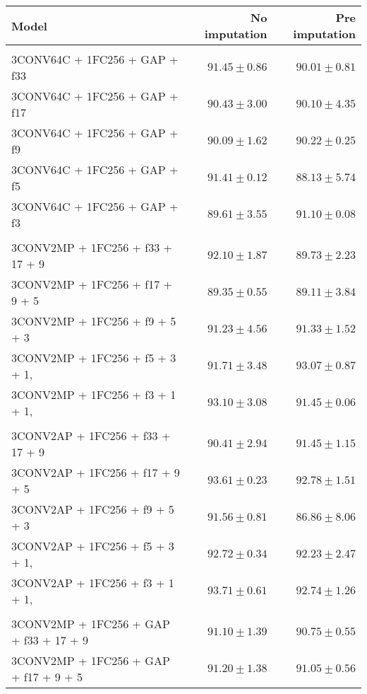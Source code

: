  \begin{table}[!htbp]
  \centering
   \begin{tabular}{lrr}
   Model                  & No imputation         & Pre imputation             \\[0.2cm]
   \hline \\[-0.2cm]
    
  
    3CONV64C + 1FC256 + GAP + f33  	 & $91.45 \pm 0.86$ 	 & $90.01 \pm 0.81$\\
    3CONV64C + 1FC256 + GAP + f17  	 & $90.43 \pm 3.00$ 	 & $90.10 \pm 4.35$\\
    3CONV64C + 1FC256 + GAP + f9  	 & $90.09 \pm 1.62$ 	 & $90.22 \pm 0.25$\\
    3CONV64C + 1FC256 + GAP + f5  	 & $91.41 \pm 0.12$ 	 & $88.13 \pm 5.74$\\
    3CONV64C + 1FC256 + GAP + f3  	 & $89.61 \pm 3.55$ 	 & $91.10 \pm 0.08$
    \\[0.2cm] \hline \\[-0.2cm]
    3CONV2MP + 1FC256 + f33 + 17 + 9  	 & $92.10 \pm 1.87$ 	 & $89.73 \pm 2.23$\\
    3CONV2MP + 1FC256 + f17 + 9 + 5  	 & $89.35 \pm 0.55$ 	 & $89.11 \pm 3.84$\\
    3CONV2MP + 1FC256 + f9 + 5 + 3  	 & $91.23 \pm 4.56$ 	 & $91.33 \pm 1.52$\\
    3CONV2MP + 1FC256 + f5 + 3 + 1,  	 & $91.71 \pm 3.48$ 	 & $93.07 \pm 0.87$\\
    3CONV2MP + 1FC256 + f3 + 1 + 1,  	 & $93.10 \pm 3.08$ 	 & $91.45 \pm 0.06$
    \\[0.2cm] \hline \\[-0.2cm]
    3CONV2AP + 1FC256 + f33 + 17 + 9  	 & $90.41 \pm 2.94$ 	 & $91.45 \pm 1.15$\\
    3CONV2AP + 1FC256 + f17 + 9 + 5  	 & $93.61 \pm 0.23$ 	 & $92.78 \pm 1.51$\\
    3CONV2AP + 1FC256 + f9 + 5 + 3  	 & $91.56 \pm 0.81$ 	 & $86.86 \pm 8.06$\\
    3CONV2AP + 1FC256 + f5 + 3 + 1,  	 & $92.72 \pm 0.34$ 	 & $92.23 \pm 2.47$\\
    3CONV2AP + 1FC256 + f3 + 1 + 1,  	 & $93.71 \pm 0.61$ 	 & $92.74 \pm 1.26$
    \\[0.2cm] \hline \\[-0.2cm]
    3CONV2MP + 1FC256 + GAP + f33 + 17 + 9  	 & $91.10 \pm 1.39$ 	 & $90.75 \pm 0.55$\\
    3CONV2MP + 1FC256 + GAP + f17 + 9 + 5  	 & $91.20 \pm 1.38$ 	 & $91.05 \pm 0.56$\\

\end{tabular}
\end{table}

